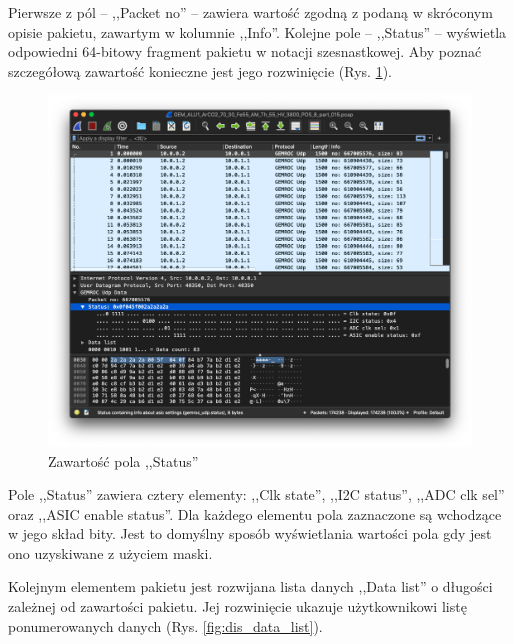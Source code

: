\documentclass[a4paper, 12pt, twoside, openright]{article}
\begin{document}
	Pierwsze z pól -- ,,Packet no'' -- zawiera wartość zgodną z podaną w skróconym opisie pakietu, zawartym w kolumnie ,,Info''. Kolejne pole -- ,,Status'' --
	wyświetla odpowiedni 64-bitowy fragment pakietu w notacji szesnastkowej. Aby poznać szczegółową zawartość konieczne jest jego rozwinięcie (Rys. \ref{fig:dis_status}).

		\begin{figure}[H]
			\centering
				\includegraphics[width=1.0\textwidth]{img/screenshot_dissector_status.png}
			\caption{Zawartość pola ,,Status''}
			\label{fig:dis_status}
		\end{figure}

	Pole ,,Status'' zawiera cztery elementy: ,,Clk state'', ,,I2C status'', ,,ADC clk sel'' oraz ,,ASIC enable status''. Dla każdego elementu
	pola zaznaczone są wchodzące w jego skład bity. Jest to domyślny sposób wyświetlania wartości pola gdy jest ono uzyskiwane z użyciem maski.

	Kolejnym elementem pakietu jest rozwijana lista danych ,,Data list'' o długości zależnej od zawartości pakietu. Jej rozwinięcie ukazuje użytkownikowi
	listę ponumerowanych danych (Rys. \ref{fig:dis_data_list}).
\end{document}
